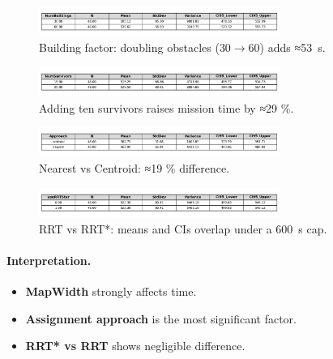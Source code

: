 \documentclass[12pt,a4paper]{report}
\begin{document}
\begin{figure}[H]
  \centering
  \includegraphics[width=0.7\textwidth]{analysis/NumBuildings_time_stats.png}
  \caption{Building factor: doubling obstacles (\(30 \to 60\)) adds ≈\SI{53}{\second}.}
\end{figure}

\begin{figure}[H]
  \centering
  \includegraphics[width=0.7\textwidth]{analysis/NumSurvivors_time_stats.png}
  \caption{Adding ten survivors raises mission time by ≈29 \%.}
\end{figure}

\begin{figure}[H]
  \centering
  \includegraphics[width=0.7\textwidth]{analysis/Approach_time_stats.png}
  \caption{Nearest vs Centroid: ≈19 \% difference.}
  \label{fig:approachstats}
\end{figure}

\begin{figure}[H]
  \centering
  \includegraphics[width=0.7\textwidth]{analysis/useRRTStar_time_stats.png}
  \caption{RRT vs RRT*: means and CIs overlap under a \SI{600}{\second} cap.}
\end{figure}

\paragraph{Interpretation.}
\begin{itemize}
  \item \textbf{MapWidth} strongly affects time.  
  \item \textbf{Assignment approach} is the most significant factor.  
  \item \textbf{RRT* vs RRT} shows negligible difference.  
\end{itemize}
\end{document}
